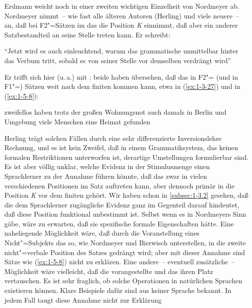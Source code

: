 \documentclass[output=paper]{langsci/langscibook}
\begin{document}
\ssubsection{}%
\label{subsec:1-5.4}
Erdmann weicht noch in einer zweiten wichtigen Einzelheit von Nordmeyer
ab. Nordmeyer nimmt~-- wie fast alle älteren Autoren (\zb Herling) und viele neuere~-- an, daß bei F2"=Sätzen im  das  die Position \textit{K} einnimmt, daß aber
ein anderer Satzbestandteil an seine Stelle treten kann. Er schreibt:
\begin{exe}
\ex\label{ex:1-5-7}
"`Jetzt wird es auch einleuchtend, warum das grammatische  unmittelbar hinter das Verbum tritt, sobald es von seiner Stelle vor demselben
verdrängt wird"' \citep[9]{Nordmeyer1883}
\end{exe}
Er trifft sich hier (u.\,a.) mit \citet[102]{Bierwisch1963}; beide haben übersehen, daß das
 in F2"= (und in F1"=) Sätzen weit nach dem finiten  kommen kann, etwa in
(\ref{ex:1-3-27}) und in (\ref{ex:1-5-8}):
\begin{exe}
\ex\label{ex:1-5-8}
zweifellos haben trotz der großen Wohnungsnot auch damals in Berlin und
Umgebung viele Menschen eine Heimat gefunden
\end{exe}
Herling trägt solchen Fällen durch eine sehr differenzierte Inversionslehre Rechnung, und es ist kein Zweifel, daß in einem Grammatiksystem, das keinen formalen
Restriktionen unterworfen ist, derartige Umstellungen formulierbar sind. Es ist aber
völlig unklar, welche Evidenz in der Stimulusmenge einen Sprachlerner zu der Annahme führen könnte, daß das  zwar in vielen verschiedenen Positionen im
Satz auftreten kann, aber dennoch primär in die Position \textit{K} vor dem finiten  gehört. Wir haben schon in \ref{subsec:1-3.2} gesehen, daß die dem Sprachlerner zugängliche Evidenz ganz im Gegenteil darauf hindeutet, daß diese Position funktional unbestimmt
ist. Selbst wenn es  in Nordmeyers Sinn gäbe, wäre zu erwarten,
daß sie spezifische formale Eigenschaften hätte. Eine naheliegende Möglichkeit
wäre, daß durch die Voranstellung eines Nicht"=Subjekts das  so, wie
Nordmeyer und Bierwisch unterstellen, in die zweite nicht"=verbale Position des
Satzes gedrängt wird; aber mit dieser Annahme sind Sätze wie (\ref{ex:1-5-8}) nicht zu erklären. Eine andere~-- eventuell zusätzliche~-- Möglichkeit wäre vielleicht, daß die vorangestellte
 und das  ihren Platz vertauschen. Es ist sehr fraglich, ob solche
Operationen in natürlichen Sprachen existieren können. Klare Beispiele dafür sind
aus keiner Sprache bekannt. In jedem Fall taugt diese Annahme nicht zur Erklärung
\end{document}
